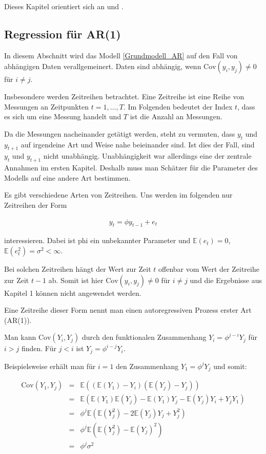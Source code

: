 \documentclass[12pt,a4paper]{article}
\theoremstyle{definition}
\theoremstyle{definition}
\theoremstyle{definition}
\begin{document}
Dieses Kapitel orientiert sich an \cite{Hansen15} und  \cite{Pinheiro00}.


\subsection{Regression für AR(1)}
\label{Regression für AR(1)}
In diesem Abschnitt wird das Modell \eqref{Grundmodell_AR} auf den Fall von abhängigen Daten verallgemeinert. Daten sind abhängig, wenn $\text{Cov}(y_i,y_j) \neq 0$ für $i \neq j$.

Insbesondere werden Zeitreihen betrachtet. Eine Zeitreihe ist eine Reihe von Messungen an Zeitpunkten $ t=1, \ldots, T $. Im Folgenden bedeutet der Index $t$, dass es sich um eine Messung handelt und $T$ ist die Anzahl an Messungen. 

Da die Messungen nacheinander getätigt werden, steht zu vermuten, dass $y_t$ und $y_{t+1}$ auf irgendeine Art und Weise nahe beieinander sind. Ist dies der Fall, sind $y_t$ und $y_{t+1}$ nicht unabhängig. Unabhängigkeit war allerdings eine der zentrale Annahmen im ersten Kapitel. Deshalb muss man Schätzer für die Parameter des Modells auf eine andere Art bestimmen.

Es gibt verschiedene Arten von Zeitreihen. Uns werden im folgenden nur Zeitreihen der Form 

\begin{align}
y_t = \phi y_{t-1} + e_t
\end{align}

interessieren. Dabei ist \gls{phi} ein unbekannter Parameter und $\mathbb{E}(e_t)=0$, $\mathbb{E}(e_t^2)=\sigma^2 < \infty$.

Bei solchen Zeitreihen hängt der Wert zur Zeit $t$ offenbar vom Wert der Zeitreihe zur Zeit $t-1$ ab. Somit ist hier $\text{Cov}(y_i,y_j) \neq 0$ für $i \neq j$ und die Ergebnisse aus Kapitel 1 können nicht angewendet werden. 

Eine Zeitreihe dieser Form nennt man einen autoregressiven Prozess erster Art (AR(1)).

Man kann $\text{Cov}(Y_i,Y_j)$ durch den funktionalen Zusammenhang $Y_i = \phi^{j-i} Y_j$ für $i>j$ finden. Für $j<i$ ist $Y_j = \phi^{i-j} Y_i$. 

Beispielsweise erhält man für $i=1$ den Zusammenhang $Y_1 = \phi^j Y_j$ und somit:

\begin{eqnarray*}
\text{Cov}(Y_1,Y_j) &=& \mathbb{E}((\mathbb{E}(Y_1)-Y_i)(\mathbb{E}(Y_j)-Y_j)) \\
&=& \mathbb{E}(\mathbb{E}(Y_1)\mathbb{E}(Y_j) - \mathbb{E}(Y_1)Y_j - \mathbb{E}(Y_j)Y_i +Y_j Y_1) \\
&=& \phi^j \mathbb{E}(\mathbb{E}(Y_j^2) - 2 \mathbb{E}(Y_j)Y_j + Y_j^2) \\
&=& \phi^j \mathbb{E}(\mathbb{E}(Y_j^2)-\mathbb{E}(Y_j)^2) \\
&=& \phi^j \sigma^2
\end{eqnarray*}
\end{document}
